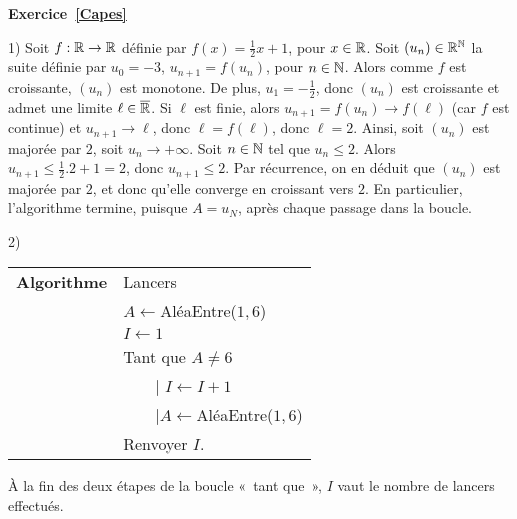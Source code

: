 \documentclass[10pt,a4paper]{article}
\begin{document}
\textbf{Exercice~\ref{Capes}}

1) Soit $f:\mathbb{R}\rightarrow \mathbb{R}$ définie par $f(x)=\frac{1}{2}x+1$, pour $x\in  \mathbb{R}$. Soit $(u_n)\in \mathbb{R}^{\mathbb{N}}$ la suite définie par $u_0=-3$, $u_{n+1}=f(u_n)$, pour $n\in \mathbb{N}$. Alors comme $f$ est croissante, $(u_n)$ est monotone. De plus, $u_1=-\frac{1}{2}$, donc $(u_n)$ est croissante et admet une limite $\ell\in \overline{\mathbb{R}}$. Si $\ell$ est finie, alors $u_{n+1}=f(u_n)\rightarrow f(\ell)$ (car $f$ est continue) et $u_{n+1}\rightarrow \ell$, donc $\ell=f(\ell)$, donc $\ell=2$. Ainsi, soit $(u_n)$ est majorée par $2$, soit $u_n\rightarrow +\infty$. Soit $n\in \mathbb{N}$ tel que $u_n \leq 2$. Alors $u_{n+1}\leq \frac{1}{2}.2+1=2$, donc $u_{n+1}\leq 2$. Par récurrence, on en déduit que $(u_n)$ est majorée par $2$, et donc qu'elle converge en croissant vers $2$. En particulier, l'algorithme termine, puisque $A=u_N$, après chaque passage dans la boucle. 

2)
\begin{tabular}{ll}
 \textbf{Algorithme} &Lancers\\
& $A\leftarrow $AléaEntre($1,6$) \\
& $I\leftarrow 1$\\
& Tant que $A\neq 6$\\
& \ \ \ {\ \rm |} $I\leftarrow I+1$\\
&  \ \ \ {\ \rm |}$A\leftarrow $AléaEntre($1,6$)\\
& Renvoyer $I$.
\end{tabular}

À la fin des deux étapes de la boucle  «~tant que~», $I$ vaut le nombre de lancers effectués. 
\end{document}
